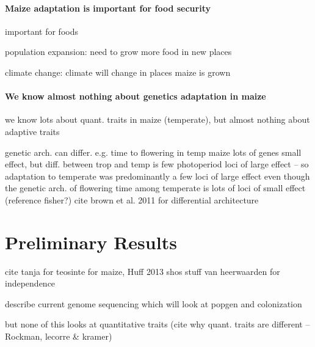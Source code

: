 \paragraph*{Maize adaptation is important for food security}

important for foods

population expansion: need to grow more food in new places

climate change: climate will change in places maize is grown

\paragraph*{We know almost nothing about genetics adaptation in maize}

we know lots about quant. traits in maize (temperate), but almost nothing about adaptive traits

genetic arch. can differ. e.g. time to flowering in temp maize lots of genes small effect, but diff. between trop and temp is few photoperiod loci of large effect -- so adaptation to temperate was predominantly a few loci of large effect even though the genetic arch. of flowering time among temperate is lots of loci of small effect (reference fisher?) cite brown et al. 2011 \citep{Brown2011b} for differential architecture

\section*{Preliminary Results}

cite tanja for teosinte \citep{Pyhajarvi2013}
for maize, Huff 2013 \citep{Hufford2013}
shos stuff
van heerwaarden for independence \citep{Hufford2013}

describe current genome sequencing which will look at popgen and colonization

but none of this looks at quantitative traits (cite why quant. traits are different -- Rockman, lecorre \& kramer)

